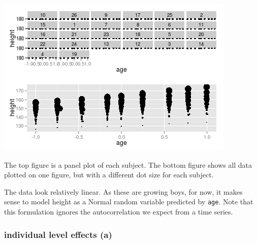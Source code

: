 \documentclass{article}
\makeatletter
\newenvironment{kframe}{%
 \def\FrameCommand##1{\hskip\@totalleftmargin \hskip-\fboxsep
 \colorbox{shadecolor}{##1}\hskip-\fboxsep
     \hskip-\linewidth \hskip-\@totalleftmargin \hskip\columnwidth}%
 \MakeFramed {\advance\hsize-\width
   \@totalleftmargin\z@ \linewidth\hsize
   \@setminipage}}%
 {\par\unskip\endMakeFramed}
\newenvironment{knitrout}{}{} %
\makeatother
\begin{document}
\begin{knitrout}
{\begin{kframe}
\centering{}\includegraphics{plot-ox} 

\end{kframe}}
\end{knitrout}


The top figure is a panel plot of each subject. 
The bottom figure shows all data plotted on one figure, but with a different dot size for each subject. 

The data look relatively linear. As these are growing boys, for now, it makes sense to model height as a Normal random variable predicted by {\tt age}. 
Note that this formulation ignores the autocorrelation we expect from a time series.

\subsubsection*{individual level effects (a)}
\end{document}
